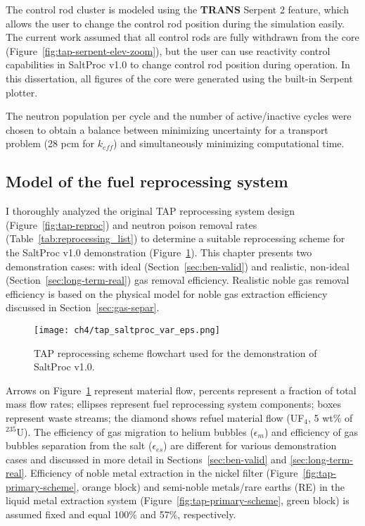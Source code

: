 The control rod cluster is modeled using the \textbf{TRANS} Serpent 2 feature, 
which allows the user to change the control rod position during the 
simulation easily. The current work assumed that all control rods are fully 
withdrawn from the core (Figure~\ref{fig:tap-serpent-elev-zoom}), but the user 
can use reactivity control capabilities in SaltProc v1.0 to change control 
rod position during operation. In this dissertation, all figures of the core 
were generated using the built-in Serpent plotter.

The neutron population per cycle and the number of active/inactive cycles were 
chosen to obtain a balance between minimizing uncertainty for a transport 
problem (28 pcm for $k_{eff}$) and simultaneously minimizing computational 
time.


\subsection{Model of the fuel reprocessing system}
I thoroughly analyzed the original \gls{TAP} reprocessing system design 
(Figure~\ref{fig:tap-reproc}) and neutron poison removal rates  
(Table~\ref{tab:reprocessing_list}) to determine a suitable reprocessing 
scheme for the SaltProc v1.0 demonstration 
(Figure~\ref{fig:demo-repro-scheme}). This chapter presents two demonstration 
cases: with ideal (Section~\ref{sec:ben-valid}) and realistic, non-ideal 
(Section~\ref{sec:long-term-real}) gas removal efficiency. Realistic noble gas 
removal efficiency is based on the physical model for noble gas extraction 
efficiency discussed in Section~\ref{sec:gas-separ}. 
\begin{figure}[htp!] %
	\centering
	\texttt{[image: ch4/tap\_saltproc\_var\_eps.png]}
	\caption{\gls{TAP} reprocessing scheme flowchart used for the 
	demonstration of SaltProc v1.0.}
	\label{fig:demo-repro-scheme}
\end{figure}

Arrows on Figure~\ref{fig:demo-repro-scheme} represent material flow, percents 
represent a fraction of total mass flow rates; ellipses represent fuel 
reprocessing system components; boxes represent waste streams; the diamond 
shows refuel material flow (UF$_4$, 5 wt\% of $^{235}$U). The efficiency 
of gas migration to helium bubbles ($\epsilon_m$) and efficiency of 
gas bubbles separation from the salt ($\epsilon_{es}$) are different for 
various demonstration cases and discussed in more detail in 
Sections~\ref{sec:ben-valid} and \ref{sec:long-term-real}. Efficiency of 
noble metal extraction in the nickel filter 
(Figure~\ref{fig:tap-primary-scheme}, orange block) and semi-noble metals/rare 
earths (RE) in the liquid metal extraction system 
(Figure~\ref{fig:tap-primary-scheme}, green block) is assumed fixed and equal 
100\% and 57\%, respectively.

